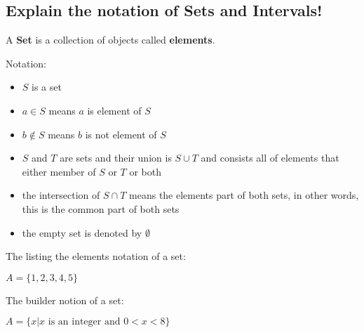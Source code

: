 \subsection{Explain the notation of Sets and Intervals!}

A \textbf{Set} is a collection of objects called \textbf{elements}.

Notation:
\begin{itemize}
    \item $S$ is a set
    \item $a \in S$ means $a$ is element of $S$
    \item $b \notin S$ means $b$ is not element of $S$
    \item $S$ and $T$ are sets and their union is $S \cup T$ and consists all of
        elements that either member of $S$ or $T$ or both
    \item the intersection of $S \cap T$ means the elements part of both sets, in
        other words, this is the common part of both sets
    \item the empty set is denoted by $\emptyset$
\end{itemize}

The listing the elements notation of a set:

\begin{center}
$A = \{1, 2, 3, 4, 5\}$
\end{center}

The builder notion of a set: 

\begin{center}
$ A = \{x | x \text{ is an integer and } 0 < x < 8 \}$
\end{center}
